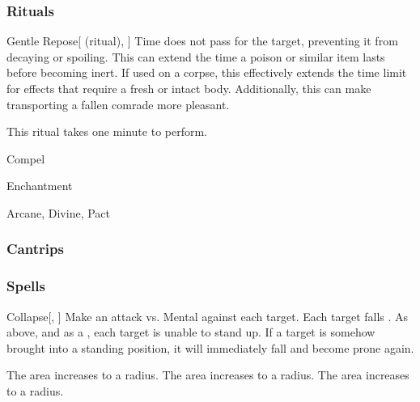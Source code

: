 \subsubsection{Rituals}


\lowercase{\hypertarget{spell:Gentle Repose}{}}\label{spell:Gentle Repose}
\begin{attuneability}[Rank 3]{\hypertarget{spell:Gentle Repose}{Gentle Repose}}[ (ritual), ]
Time does not pass for the target, preventing it from decaying or spoiling.
This can extend the time a poison or similar item lasts before becoming inert.
If used on a corpse, this effectively extends the time limit for effects that require a fresh or intact body.
Additionally, this can make transporting a fallen comrade more pleasant.


This ritual takes one minute to perform.
\end{attuneability}
\vspace{0.25em}


\newpage
\begin{spellsection}{Compel}

\begin{spellheader}
\end{spellheader}


 Enchantment

 Arcane, Divine, Pact

\subsubsection{Cantrips}


\end{spellsection}


\subsubsection{Spells}


\lowercase{\hypertarget{spell:Collapse}{}}\label{spell:Collapse}
\begin{freeability}[Rank 1]{\hypertarget{spell:Collapse}{Collapse}}[, ]
Make an attack vs. Mental against each target.
\hit Each target falls .
\crit As above, and as a , each target is unable to stand up.
If a target is somehow brought into a standing position, it will immediately fall and become prone again.

\rankline
{} The area increases to a \arealarge radius.
 The area increases to a \areahuge radius.
 The area increases to a \areaext radius.
\end{freeability}
\vspace{0.25em}



